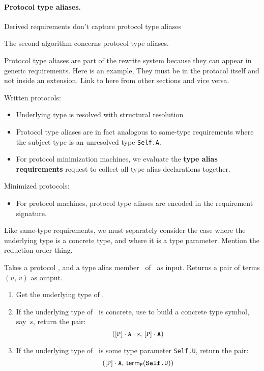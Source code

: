 \documentclass[../generics]{subfiles}
\begin{document}
\paragraph{Protocol type aliases.}
Derived requirements don’t capture protocol type aliases

The second algorithm concerns protocol type aliases. 

Protocol type aliases are part of the rewrite system because they can appear in generic requirements. Here is an example, They must be in the protocol itself and not inside an extension. Link to here from other sections and vice versa.

Written protocols:
\begin{itemize}
\item Underlying type is resolved with structural resolution
\item Protocol type aliases are in fact analogous to same-type requirements where the subject type is an unresolved type \texttt{Self.A}.
\item For protocol minimization machines, we evaluate the \textbf{type alias requirements} request to collect all type alias declarations together.
\end{itemize}

Minimized protocols:
\begin{itemize}
\item For protocol machines, protocol type aliases are encoded in the requirement signature. 
\end{itemize}

Like same-type requirements, we must separately consider the case where the underlying type is a concrete type, and where it is a type parameter. Mention the reduction order thing.

\begin{algorithm}
Takes a protocol \tP, and a type alias member \nA\ of \tP\ as input. Returns a pair of terms $(u,\,v)$ as output.
\begin{enumerate}
\item Get the underlying type of \nA.
\item If the underlying type of \nA\ is concrete, use  to build a concrete type symbol, say~$s$, return the pair:
\[([\texttt{P}] \cdot \texttt{A} \cdot s,\, [\texttt{P}] \cdot \texttt{A})\]
\item If the underlying type of \nA\ is some type parameter \texttt{Self.U}, return the pair:
\[([\texttt{P}] \cdot \texttt{A},\, \mathsf{term}_{\texttt{P}}(\texttt{Self.U}))\]
\end{enumerate}
\end{algorithm}
\end{document}
